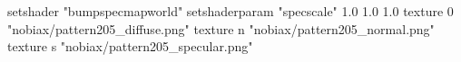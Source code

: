 setshader "bumpspecmapworld"
setshaderparam "specscale" 1.0 1.0 1.0
    texture 0 "nobiax/pattern205_diffuse.png"
    texture n "nobiax/pattern205_normal.png"
    texture s "nobiax/pattern205_specular.png"